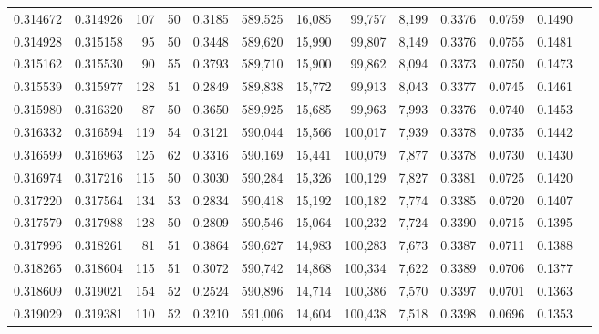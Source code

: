 \begin{tabular}{rrrrrrrrrrrrr}
0.314672 & 0.314926 &   107 &  50 &                                     0.3185 & 589,525 &  16,085 &  99,757 &   8,199 & 0.3376 & 0.0759 & 0.1490 \\
0.314928 & 0.315158 &    95 &  50 &                                     0.3448 & 589,620 &  15,990 &  99,807 &   8,149 & 0.3376 & 0.0755 & 0.1481 \\
0.315162 & 0.315530 &    90 &  55 &                                     0.3793 & 589,710 &  15,900 &  99,862 &   8,094 & 0.3373 & 0.0750 & 0.1473 \\
0.315539 & 0.315977 &   128 &  51 &                                     0.2849 & 589,838 &  15,772 &  99,913 &   8,043 & 0.3377 & 0.0745 & 0.1461 \\
0.315980 & 0.316320 &    87 &  50 &                                     0.3650 & 589,925 &  15,685 &  99,963 &   7,993 & 0.3376 & 0.0740 & 0.1453 \\
0.316332 & 0.316594 &   119 &  54 &                                     0.3121 & 590,044 &  15,566 & 100,017 &   7,939 & 0.3378 & 0.0735 & 0.1442 \\
0.316599 & 0.316963 &   125 &  62 &                                     0.3316 & 590,169 &  15,441 & 100,079 &   7,877 & 0.3378 & 0.0730 & 0.1430 \\
0.316974 & 0.317216 &   115 &  50 &                                     0.3030 & 590,284 &  15,326 & 100,129 &   7,827 & 0.3381 & 0.0725 & 0.1420 \\
0.317220 & 0.317564 &   134 &  53 &                                     0.2834 & 590,418 &  15,192 & 100,182 &   7,774 & 0.3385 & 0.0720 & 0.1407 \\
0.317579 & 0.317988 &   128 &  50 &                                     0.2809 & 590,546 &  15,064 & 100,232 &   7,724 & 0.3390 & 0.0715 & 0.1395 \\
0.317996 & 0.318261 &    81 &  51 &                                     0.3864 & 590,627 &  14,983 & 100,283 &   7,673 & 0.3387 & 0.0711 & 0.1388 \\
0.318265 & 0.318604 &   115 &  51 &                                     0.3072 & 590,742 &  14,868 & 100,334 &   7,622 & 0.3389 & 0.0706 & 0.1377 \\
0.318609 & 0.319021 &   154 &  52 &                                     0.2524 & 590,896 &  14,714 & 100,386 &   7,570 & 0.3397 & 0.0701 & 0.1363 \\
0.319029 & 0.319381 &   110 &  52 &                                     0.3210 & 591,006 &  14,604 & 100,438 &   7,518 & 0.3398 & 0.0696 & 0.1353 \\

\end{tabular}
